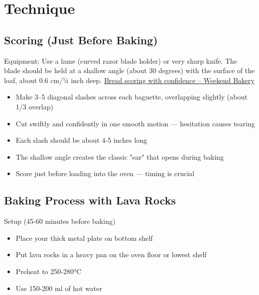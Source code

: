 \documentclass[10pt,a4paper]{article}
\begin{document}
    \section{Technique}

    \subsection{Scoring (Just Before Baking)}
    Equipment: Use a lame (curved razor blade holder) or very sharp knife. The blade should be held at a shallow angle (about 30 degrees) with the surface of the loaf, about 0.6 cm/¼ inch deep. \href{https://www.weekendbakery.com/posts/bread-scoring-with-confidence/}{Bread scoring with confidence – Weekend Bakery}

    \begin{itemize}[leftmargin=*]
        \item Make 3--5 diagonal slashes across each baguette, overlapping slightly (about 1/3 overlap)
        \item Cut swiftly and confidently in one smooth motion --- hesitation causes tearing
        \item Each slash should be about 4-5 inches long
        \item The shallow angle creates the classic "ear" that opens during baking
        \item Score just before loading into the oven --- timing is crucial
    \end{itemize}

    \subsection{Baking Process with Lava Rocks}
    Setup (45-60 minutes before baking)
    \begin{itemize}[leftmargin=*]
        \item Place your thick metal plate on bottom shelf
        \item Put lava rocks in a heavy pan on the oven floor or lowest shelf
        \item Preheat to 250-280°C
        \item Use 150-200 ml of hot water
    \end{itemize}
\end{document}
